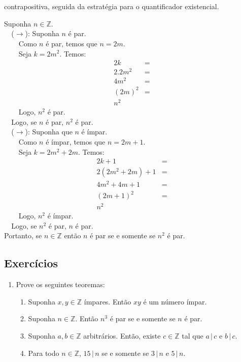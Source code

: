 \begin{Example}
contrapositiva, seguida da estratégia para o quantificador existencial.
\begin{flushleft}
Suponha $n\in\mathbb{Z}$.\\
\verb|  |($\to$): Suponha $n$ é par.\\
\verb|    |Como $n$ é par, temos que $n = 2m$.\\
\verb|    |Seja $k = 2m^2$. Temos:\\
\[
\begin{array}{lc}
2k & = \\
2.2m^2 & = \\
4m^2 & = \\
(2m)^2 & = \\
n^2
\end{array}
\]
\verb|    |Logo, $n^2$ é par.\\
\verb|  |Logo, se $n$ é par, $n^2$ é par.\\
\verb|  |($\to$): Suponha que $n$ é ímpar.\\
\verb|    |Como $n$ é ímpar, temos que $n = 2m + 1$.\\
\verb|    |Seja $k = 2m^2 + 2m$. Temos:\\
\[
\begin{array}{lc}
2k+1 & = \\
2(2m^2 + 2m) + 1 & = \\
4m^2 + 4m + 1 & = \\
(2m + 1)^2 & = \\
n^2
\end{array}
\]
\verb|    |Logo, $n^2$ é ímpar.\\
\verb|  |Logo, se $n^2$ é par, $n$ é par.\\
Portanto, se $n\in\mathbb{Z}$ então $n$ é par se e somente se $n^2$ é par.
\end{flushleft}
\end{Example}

\subsection{Exercícios}

\begin{enumerate}
  \item Prove os seguintes teoremas:
    \begin{enumerate}
      \item Suponha $x,y\in\mathbb{Z}$ ímpares. Então $xy$ é um número
        ímpar.
      \item Suponha $n\in\mathbb{Z}$. Então $n^3$ é par se e somente
        se $n$ é par.
      \item Suponha $a,b\in\mathbb{Z}$ arbitrários. Então, existe
        $c\in\mathbb{Z}$ tal que $a\,|\,c$ e $b\,|\,c$.
      \item Para todo $n\in\mathbb{Z}$, $15\,|\,n$ se e somente se
        $3\,|\,n$ e $5\,|\,n$.
    \end{enumerate}
\end{enumerate}

